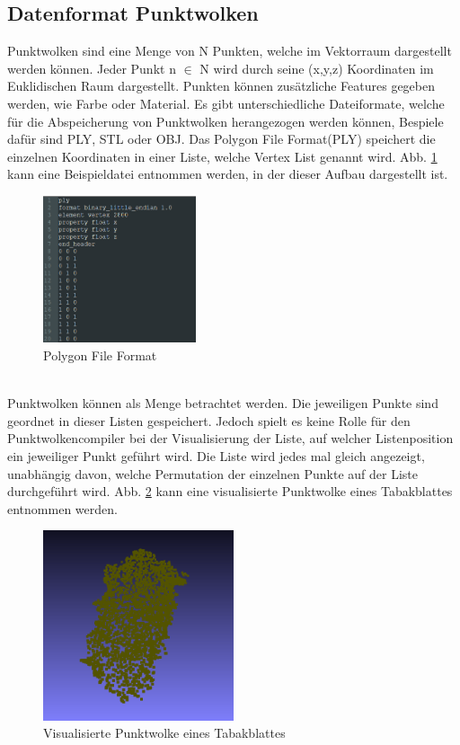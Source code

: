 \documentclass{llncs}
\begin{document}
\subsection{Datenformat Punktwolken}\label{sec:punktwolken}

Punktwolken sind eine Menge von N Punkten, welche im Vektorraum dargestellt werden können. Jeder Punkt n $\in$ N wird durch seine (x,y,z) Koordinaten im Euklidischen Raum dargestellt. Punkten können zusätzliche Features gegeben werden, wie Farbe oder Material. Es gibt unterschiedliche Dateiformate, welche für die Abspeicherung von Punktwolken herangezogen werden können, Bespiele dafür sind PLY, STL oder OBJ. Das Polygon File Format(PLY) speichert die einzelnen Koordinaten in einer Liste, welche Vertex List genannt wird. Abb. \ref{fig:Bild7} kann eine Beispieldatei entnommen werden, in der dieser Aufbau dargestellt ist. 
\\
\begin{figure}[htbp] 
	\centering
	\includegraphics[width=0.4\textwidth]{plyexample.png}
	\caption{Polygon File Format}
	\label{fig:Bild7}
\end{figure}
\\
Punktwolken können als Menge betrachtet werden. Die jeweiligen Punkte sind geordnet in dieser Listen gespeichert. Jedoch spielt es keine Rolle für den Punktwolkencompiler bei der Visualisierung der Liste, auf welcher Listenposition ein jeweiliger Punkt geführt wird. Die Liste wird jedes mal gleich angezeigt, unabhängig davon, welche Permutation der einzelnen Punkte auf der Liste durchgeführt wird. Abb. \ref{fig:Bild8} kann eine visualisierte Punktwolke eines Tabakblattes entnommen werden. 
\\
\begin{figure}[htbp] 
	\centering
	\includegraphics[width=0.5\textwidth]{leaf1.png}
	\caption{Visualisierte Punktwolke eines Tabakblattes}
	\label{fig:Bild8}
\end{figure}
\newpage
\end{document}
